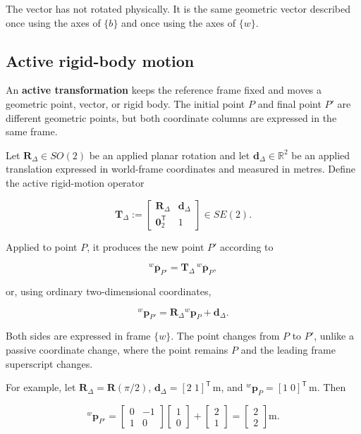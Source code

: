 \documentclass[
  australian,
  12pt,
  letterpaper,
  DIV=11,
  numbers=noendperiod,
  twoside]{scrreprt}
\begin{document}
The vector has not rotated physically. It is the same geometric vector
described once using the axes of \(\{b\}\) and once using the axes of
\(\{w\}\).

\subsection{Active rigid-body motion}\label{active-rigid-body-motion}

An \textbf{active transformation} keeps the reference frame fixed and
moves a geometric point, vector, or rigid body. The initial point \(P\)
and final point \(P'\) are different geometric points, but both
coordinate columns are expressed in the same frame.

Let \(\mathbf R_{\Delta}\in SO(2)\) be an applied planar rotation and
let \(\mathbf d_{\Delta}\in\mathbb R^2\) be an applied translation
expressed in world-frame coordinates and measured in metres. Define the
active rigid-motion operator

\[
\mathbf T_{\Delta}
\mathrel{:=}
\begin{bmatrix}
\mathbf R_{\Delta}&\mathbf d_{\Delta}\\
\mathbf 0_2^\mathsf T&1
\end{bmatrix}
\in SE(2).
\]

Applied to point \(P\), it produces the new point \(P'\) according to

\[
\boxed{
{}^{w}\overline{\mathbf p}_{P'}
=
\mathbf T_{\Delta}\,{}^{w}\overline{\mathbf p}_{P}
},
\]

or, using ordinary two-dimensional coordinates,

\[
{}^{w}\mathbf p_{P'}
=
\mathbf R_{\Delta}{}^{w}\mathbf p_P
+
\mathbf d_{\Delta}.
\]

Both sides are expressed in frame \(\{w\}\). The point changes from
\(P\) to \(P'\), unlike a passive coordinate change, where the point
remains \(P\) and the leading frame superscript changes.

For example, let \(\mathbf R_{\Delta}=\mathbf R(\pi/2)\),
\(\mathbf d_{\Delta}=[2\;1]^\mathsf T\,\mathrm m\), and
\({}^{w}\mathbf p_P=[1\;0]^\mathsf T\,\mathrm m\). Then

\[
{}^{w}\mathbf p_{P'}
=
\begin{bmatrix}
0&-1\\
1&0
\end{bmatrix}
\begin{bmatrix}
1\\0
\end{bmatrix}
+
\begin{bmatrix}
2\\1
\end{bmatrix}
=
\begin{bmatrix}
2\\2
\end{bmatrix}
\mathrm m.
\]
\end{document}
